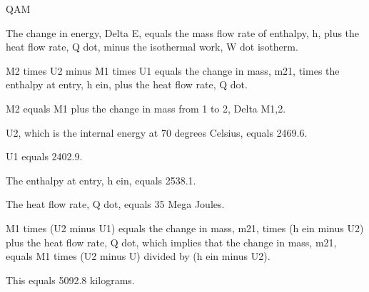 QAM

The change in energy, Delta E, equals the mass flow rate of enthalpy, h, plus the heat flow rate, Q dot, minus the isothermal work, W dot isotherm.

M2 times U2 minus M1 times U1 equals the change in mass, m21, times the enthalpy at entry, h ein, plus the heat flow rate, Q dot.

M2 equals M1 plus the change in mass from 1 to 2, Delta M1,2.

U2, which is the internal energy at 70 degrees Celsius, equals 2469.6.

U1 equals 2402.9.

The enthalpy at entry, h ein, equals 2538.1.

The heat flow rate, Q dot, equals 35 Mega Joules.

M1 times (U2 minus U1) equals the change in mass, m21, times (h ein minus U2) plus the heat flow rate, Q dot, which implies that the change in mass, m21, equals M1 times (U2 minus U) divided by (h ein minus U2).

This equals 5092.8 kilograms.